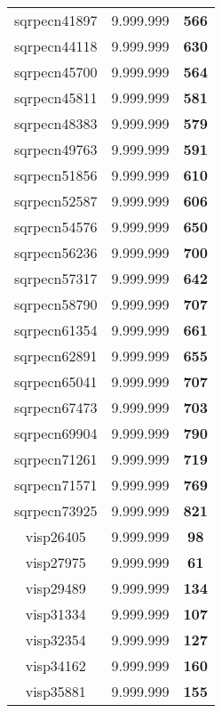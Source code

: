 \begin{tabular}{cc||c}
sqrpecn41897     & 9.999.999        & {\bf 566}       \\ 
sqrpecn44118     & 9.999.999        & {\bf 630}       \\ 
sqrpecn45700     & 9.999.999        & {\bf 564}       \\ 
sqrpecn45811     & 9.999.999        & {\bf 581}       \\ 
sqrpecn48383     & 9.999.999        & {\bf 579}       \\ 
sqrpecn49763     & 9.999.999        & {\bf 591}       \\ 
sqrpecn51856     & 9.999.999        & {\bf 610}       \\ 
sqrpecn52587     & 9.999.999        & {\bf 606}       \\ 
sqrpecn54576     & 9.999.999        & {\bf 650}       \\ 
sqrpecn56236     & 9.999.999        & {\bf 700}       \\ 
sqrpecn57317     & 9.999.999        & {\bf 642}       \\ 
sqrpecn58790     & 9.999.999        & {\bf 707}       \\ 
sqrpecn61354     & 9.999.999        & {\bf 661}       \\ 
sqrpecn62891     & 9.999.999        & {\bf 655}       \\ 
sqrpecn65041     & 9.999.999        & {\bf 707}       \\ 
sqrpecn67473     & 9.999.999        & {\bf 703}       \\ 
sqrpecn69904     & 9.999.999        & {\bf 790}       \\ 
sqrpecn71261     & 9.999.999        & {\bf 719}       \\ 
sqrpecn71571     & 9.999.999        & {\bf 769}       \\ 
sqrpecn73925     & 9.999.999        & {\bf 821}       \\ 
visp26405        & 9.999.999        & {\bf 98}        \\ 
visp27975        & 9.999.999        & {\bf 61}        \\ 
visp29489        & 9.999.999        & {\bf 134}       \\ 
visp31334        & 9.999.999        & {\bf 107}       \\ 
visp32354        & 9.999.999        & {\bf 127}       \\ 
visp34162        & 9.999.999        & {\bf 160}       \\ 
visp35881        & 9.999.999        & {\bf 155}       \\ 

\end{tabular}
